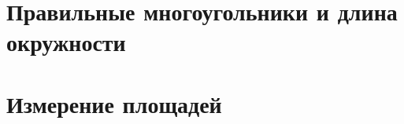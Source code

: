 \documentclass[twoside]{book}
\begin{document}
\chapter[Правильные многоугольники]{Правильные многоугольники и длина окружности}



\chapter{Измерение площадей}





{\scriptsize
\printindex
}



\tableofcontents

\newpage\null\thispagestyle{empty}

\end{document}
